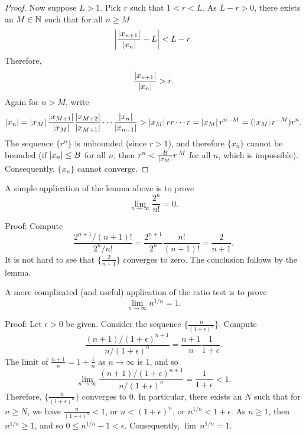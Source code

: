 \begin{proof}
Now suppose $L > 1$.  Pick
$r$ such that $1 < r < L$.  As $L-r > 0$,
there exists an $M \in {\mathbb{N}}$ such that for
all $n \geq M$
\begin{equation*}
\left\lvert {\frac{\left\lvert {x_{n+1}} \right\rvert}{\left\lvert {x_n} \right\rvert} - L} \right\rvert < L-r .
\end{equation*}
Therefore,
\begin{equation*}
\frac{\left\lvert {x_{n+1}} \right\rvert}{\left\lvert {x_n} \right\rvert} > r .
\end{equation*}
Again for $n > M$,
write
\begin{equation*}
\left\lvert {x_n} \right\rvert =
\left\lvert {x_M} \right\rvert
\frac{\left\lvert {x_{M+1}} \right\rvert}{\left\lvert {x_{M}} \right\rvert}
\frac{\left\lvert {x_{M+2}} \right\rvert}{\left\lvert {x_{M+1}} \right\rvert}
\cdots
\frac{\left\lvert {x_{n}} \right\rvert}{\left\lvert {x_{n-1}} \right\rvert}
>
\left\lvert {x_M} \right\rvert
r r \cdots r = \left\lvert {x_M} \right\rvert r^{n-M} = (\left\lvert {x_M} \right\rvert r^{-M}) r^n .
\end{equation*}
The sequence $\{ r^n \}$ is unbounded (since $r > 1$), and therefore
$\{x_n\}$ cannot be bounded (if $\left\lvert {x_n} \right\rvert \leq B$ for all $n$, then
$r^n < \frac{B}{\left\lvert {x_M} \right\rvert} r^{\:M}$ for all $n$, which is impossible).
Consequently, $\{ x_n \}$ cannot converge.
\end{proof}

\begin{example}
A simple application of the lemma above is to prove 
\begin{equation*}
\lim_{n\to\infty} \frac{2^n}{n!} = 0 .
\end{equation*}

Proof:
Compute
\begin{equation*}
\frac{2^{n+1} / (n+1)!}{2^n/n!}
=
\frac{2^{n+1}}{2^n}\frac{n!}{(n+1)!}
=
\frac{2}{n+1} .
\end{equation*}
It is not hard to see that $\{ \frac{2}{n+1} \}$ converges to zero.
The conclusion follows by the lemma.
\end{example}

\begin{example} \label{example:nto1overn}
A more complicated (and useful) application of the ratio test is to prove 
\begin{equation*}
\lim_{n\to\infty} n^{1/n} = 1 .
\end{equation*}

Proof:
Let $\epsilon > 0$ be given.  Consider the sequence
$\bigl\{ \frac{n}{{(1+\epsilon)}^n} \bigr\}$.  Compute
\begin{equation*}
\frac{(n+1)/{(1+\epsilon)}^{n+1}}{n/{(1+\epsilon)}^{n}}
=
\frac{n+1}{n} \frac{1}{1+\epsilon} .
\end{equation*}
The limit of $\frac{n+1}{n} = 1+\frac{1}{n}$ as $n \to \infty$ is 1, and so
\begin{equation*}
\lim_{n\to \infty} \frac{(n+1)/{(1+\epsilon)}^{n+1}}{n/{(1+\epsilon)}^{n}}
=
\frac{1}{1+\epsilon}  < 1 .
\end{equation*}
Therefore, $\bigl \{ \frac{n}{{(1+\epsilon)}^n} \bigr\}$ converges to 0.
In particular,
there exists an $N$ such that for $n \geq N$, we have
$\frac{n}{{(1+\epsilon)}^n} < 1$, or 
$n < {(1+\epsilon)}^n$, or 
$n^{1/n} < 1+\epsilon$.  As $n \geq 1$, then $n^{1/n} \geq 1$, and
so $0 \leq n^{1/n}-1 < \epsilon$. Consequently,
$\lim\, n^{1/n} = 1$.
\end{example}

